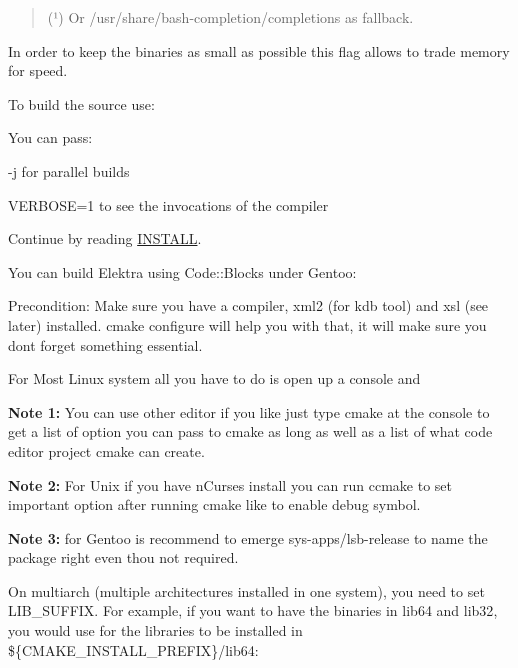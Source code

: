 \begin{quote}
(¹) Or {\ttfamily /usr/share/bash-\/completion/completions} as fallback. \end{quote}


In order to keep the binaries as small as possible this flag allows to trade memory for speed.

To build the source use\+:


\begin{DoxyCode}{0}
\end{DoxyCode}


You can pass\+:


\begin{DoxyItemize}
\item {\ttfamily -\/j} for parallel builds
\item {\ttfamily V\+E\+R\+B\+O\+SE=1} to see the invocations of the compiler
\end{DoxyItemize}

Continue by reading \mbox{\hyperlink{doc_INSTALL_md}{I\+N\+S\+T\+A\+LL}}.

You can build Elektra using Code\+::\+Blocks under Gentoo\+:

Precondition\+: Make sure you have a compiler, xml2 (for kdb tool) and xsl (see later) installed. cmake configure will help you with that, it will make sure you don\textquotesingle{}t forget something essential.

For Most Linux system all you have to do is open up a console and


\begin{DoxyCode}{0}
\end{DoxyCode}


{\bfseries{Note 1\+:}} You can use other editor if you like just type cmake at the console to get a list of option you can pass to cmake as long as well as a list of what code editor project cmake can create.

{\bfseries{Note 2\+:}} For Unix if you have n\+Curses install you can run {\ttfamily ccmake} to set important option after running cmake like to enable debug symbol.

{\bfseries{Note 3\+:}} for Gentoo is recommend to emerge sys-\/apps/lsb-\/release to name the package right even thou not required.

On multiarch (multiple architectures installed in one system), you need to set {\ttfamily L\+I\+B\+\_\+\+S\+U\+F\+F\+IX}. For example, if you want to have the binaries in {\ttfamily lib64} and {\ttfamily lib32}, you would use for the libraries to be installed in {\ttfamily \$\{C\+M\+A\+K\+E\+\_\+\+I\+N\+S\+T\+A\+L\+L\+\_\+\+P\+R\+E\+F\+IX\}/lib64}\+:


